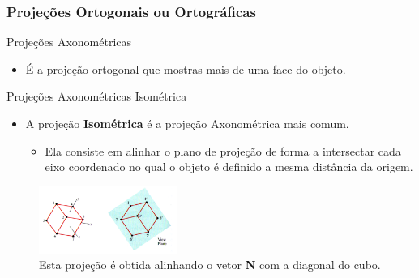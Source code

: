 \documentclass{beamer}
\begin{document}
\begin{frame}
\frametitle{Projeções Ortogonais ou Ortográficas}
	\begin{block}{Projeções Axonométricas}
		\begin{itemize}
			\item É a projeção ortogonal que mostras mais de uma face do objeto.
		\end{itemize}
	\end{block}
	
	\begin{block}{Projeções Axonométricas Isométrica}
		\begin{itemize}
			\item A projeção \textbf{Isométrica} é a projeção Axonométrica mais comum.
				\begin{itemize}
					\item Ela consiste em alinhar o plano de projeção de forma a intersectar cada eixo coordenado no qual o objeto é definido a mesma distância da origem.
				\end{itemize}
		\end{itemize}
	\end{block}	
	
	\begin{figure}[!h]
			\begin{center}
			\includegraphics[width=0.4\textwidth]{Figures/ProIso}
			\caption{Esta projeção é obtida alinhando o vetor \textbf{N} com a diagonal do cubo.}
			\end{center}
	\end{figure}
\end{frame}
\end{document}

